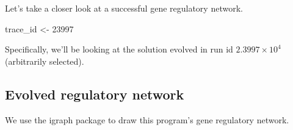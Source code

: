 \documentclass[
]{book}
\newenvironment{Shaded}{\begin{snugshade}}{\end{snugshade}}
\newcommand{\DecValTok}[1]{\textcolor[rgb]{0.00,0.00,0.81}{#1}}
\newcommand{\NormalTok}[1]{#1}
\newcommand{\StringTok}[1]{\textcolor[rgb]{0.31,0.60,0.02}{#1}}
\begin{document}
Let's take a closer look at a successful gene regulatory network.

\begin{Shaded}
\begin{Highlighting}[]
\NormalTok{trace\_id \textless{}{-}}\StringTok{ }\DecValTok{23997}
\end{Highlighting}
\end{Shaded}

Specifically, we'll be looking at the solution evolved in run id \ensuremath{2.3997\times 10^{4}} (arbitrarily selected).

\hypertarget{evolved-regulatory-network-1}{%
\subsection{Evolved regulatory network}\label{evolved-regulatory-network-1}}

We use the igraph package to draw this program's gene regulatory network.
\end{document}
